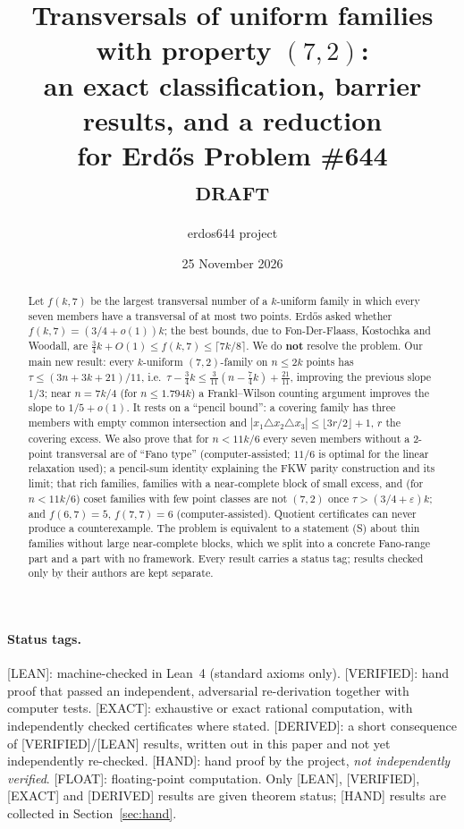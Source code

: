 \documentclass[11pt]{article}
\title{Transversals of uniform families with property $(7,2)$:\\[3pt]
\large an exact classification, barrier results, and a reduction\\ for Erd\H{o}s Problem \#644 \\[4pt]
\normalsize\textsc{draft}}
\author{erdos644 project}
\date{25 November 2026}
\theoremstyle{definition}
\newcommand{\st}[1]{\textsf{\small[#1]}}
\begin{document}
\maketitle

\begin{abstract}
\noindent Let $f(k,7)$ be the largest transversal number of a $k$-uniform family in which every seven members
have a transversal of at most two points. Erd\H{o}s asked whether $f(k,7)=(3/4+o(1))k$; the best bounds,
due to Fon-Der-Flaass, Kostochka and Woodall, are $\tfrac34k+O(1)\le f(k,7)\le\lceil 7k/8\rceil$.
We do \textbf{not} resolve the problem. Our main new result: every $k$-uniform $(7,2)$-family on $n\le2k$ points has
$\tau\le(3n+3k+21)/11$, i.e.\ $\tau-\tfrac34k\le\tfrac3{11}(n-\tfrac74k)+\tfrac{21}{11}$, improving the previous slope
$1/3$; near $n=7k/4$ (for $n\le1.794k$) a Frankl--Wilson counting argument improves the slope to $1/5+o(1)$. It rests on a ``pencil bound'': a covering family has three members with empty common intersection and
$|x_1\triangle x_2\triangle x_3|\le\lfloor3r/2\rfloor+1$, $r$ the covering excess. We also prove that for $n<11k/6$
every seven members without a 2-point transversal are of ``Fano type'' (computer-assisted; $11/6$ is optimal for the
linear relaxation used); a pencil-sum identity explaining the FKW parity construction and its limit; that rich
families, families with a near-complete block of small excess, and (for $n<11k/6$) coset families with few point
classes are not $(7,2)$ once $\tau>(3/4+\varepsilon)k$; and $f(6,7)=5$, $f(7,7)=6$ (computer-assisted). Quotient
certificates can never produce a counterexample. The problem is equivalent to a statement (S) about thin families
without large near-complete blocks, which we split into a concrete Fano-range part and a part with no framework.
Every result carries a status tag; results checked only by their authors are kept separate.
\end{abstract}

\paragraph{Status tags.} \st{LEAN}: machine-checked in Lean~4 (standard axioms only). \st{VERIFIED}: hand proof
that passed an independent, adversarial re-derivation together with computer tests. \st{EXACT}: exhaustive or exact
rational computation, with independently checked certificates where stated. \st{DERIVED}: a short consequence of
\st{VERIFIED}/\st{LEAN} results, written out in this paper and not yet independently re-checked.
\st{HAND}: hand proof by the project, \emph{not independently verified}. \st{FLOAT}: floating-point computation.
Only \st{LEAN}, \st{VERIFIED}, \st{EXACT} and \st{DERIVED} results are given theorem status; \st{HAND} results are
collected in Section~\ref{sec:hand}.
\end{document}
